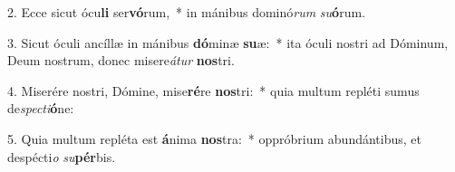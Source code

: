 2. Ecce sicut ócu\textbf{li} ser\textbf{vó}rum,~*  in mánibus dominó\textit{rum} \textit{su}\textbf{ó}rum.\

3. Sicut óculi ancíllæ in mánibus \textbf{dó}minæ \textbf{su}æ:~*  ita óculi nostri ad Dóminum, Deum nostrum, donec misere\textit{á}\textit{tur} \textbf{nos}tri.\

4. Miserére nostri, Dómine, mise\textbf{ré}re \textbf{nos}tri:~*  quia multum repléti sumus de\textit{spec}\textit{ti}\textbf{ó}ne:\

5. Quia multum repléta est \textbf{á}nima \textbf{nos}tra:~*  oppróbrium abundántibus, et despécti\textit{o} \textit{su}\textbf{pér}bis.\

